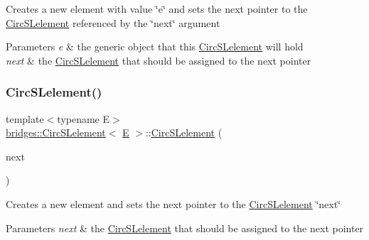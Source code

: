 Creates a new element with value \char`\"{}e\char`\"{} and sets the next pointer to the \mbox{\hyperlink{classbridges_1_1_circ_s_lelement}{Circ\+S\+Lelement}} referenced by the \char`\"{}next\char`\"{} argument


\begin{DoxyParams}{Parameters}
{\em e} & the generic object that this \mbox{\hyperlink{classbridges_1_1_circ_s_lelement}{Circ\+S\+Lelement}} will hold \\
\hline
{\em next} & the \mbox{\hyperlink{classbridges_1_1_circ_s_lelement}{Circ\+S\+Lelement}} that should be assigned to the next pointer \\
\hline
\end{DoxyParams}
\mbox{\label{classbridges_1_1_circ_s_lelement_a1fda146fc0da1d8c7d6440cbbbb2ce42}} 
\subsubsection{\texorpdfstring{CircSLelement()}{CircSLelement()}\hspace{0.1cm}{\footnotesize\ttfamily [4/4]}}
{\footnotesize\ttfamily template$<$typename E$>$ \\
\mbox{\hyperlink{classbridges_1_1_circ_s_lelement}{bridges\+::\+Circ\+S\+Lelement}}$<$ \mbox{\hyperlink{namespacebridges_acfb0a4f7877d8f63de3e6862004c50eda3a3ea00cfc35332cedf6e5e9a32e94da}{E}} $>$\+::\mbox{\hyperlink{classbridges_1_1_circ_s_lelement}{Circ\+S\+Lelement}} (\begin{DoxyParamCaption}\item[{\mbox{\hyperlink{classbridges_1_1_circ_s_lelement}{Circ\+S\+Lelement}}$<$ \mbox{\hyperlink{namespacebridges_acfb0a4f7877d8f63de3e6862004c50eda3a3ea00cfc35332cedf6e5e9a32e94da}{E}} $>$ $\ast$}]{next }\end{DoxyParamCaption})\hspace{0.3cm}{\ttfamily [inline]}}

Creates a new element and sets the next pointer to the \mbox{\hyperlink{classbridges_1_1_circ_s_lelement}{Circ\+S\+Lelement}} \char`\"{}next\char`\"{} 
\begin{DoxyParams}{Parameters}
{\em next} & the \mbox{\hyperlink{classbridges_1_1_circ_s_lelement}{Circ\+S\+Lelement}} that should be assigned to the next pointer \\
\hline
\end{DoxyParams}


